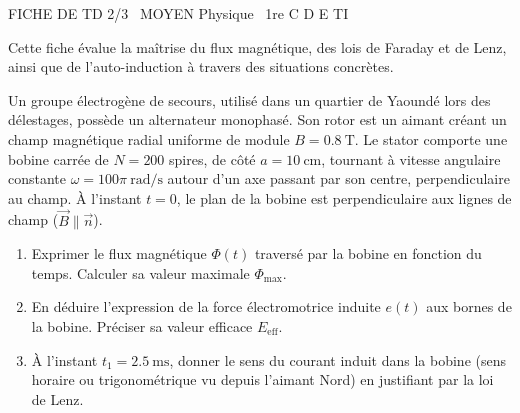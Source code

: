 \documentclass[11pt]{article}
\begin{document}
\begin{tcolorbox}[enhanced,colback=popink,colframe=popink,arc=10pt,boxrule=0pt,left=12pt,right=12pt,top=9pt,bottom=9pt]
{\color{white}\popxbold\small FICHE DE TD 2/3 \textbullet\ MOYEN \hfill Physique \textbullet\ 1re C D E TI\par}
\end{tcolorbox}
\vspace{4pt}
Cette fiche évalue la maîtrise du flux magnétique, des lois de Faraday et de Lenz, ainsi que de l'auto-induction à travers des situations concrètes.

\begin{exercice}
Un groupe électrogène de secours, utilisé dans un quartier de Yaoundé lors des délestages, possède un alternateur monophasé. Son rotor est un aimant créant un champ magnétique radial uniforme de module $B = \SI{0,8}{\tesla}$. Le stator comporte une bobine carrée de $N = 200$ spires, de côté $a = \SI{10}{\centi\metre}$, tournant à vitesse angulaire constante $\omega = 100\pi~\si{\radian\per\second}$ autour d'un axe passant par son centre, perpendiculaire au champ. À l'instant $t=0$, le plan de la bobine est perpendiculaire aux lignes de champ ($\vec{B} \parallel \vec{n}$).
\begin{enumerate}
    \item Exprimer le flux magnétique $\Phi(t)$ traversé par la bobine en fonction du temps. Calculer sa valeur maximale $\Phi_{\text{max}}$.
    \item En déduire l'expression de la force électromotrice induite $e(t)$ aux bornes de la bobine. Préciser sa valeur efficace $E_{\text{eff}}$.
    \item À l'instant $t_1 = \SI{2,5}{\milli\second}$, donner le sens du courant induit dans la bobine (sens horaire ou trigonométrique vu depuis l'aimant Nord) en justifiant par la loi de Lenz.
\end{enumerate}
\end{exercice}
\end{document}
